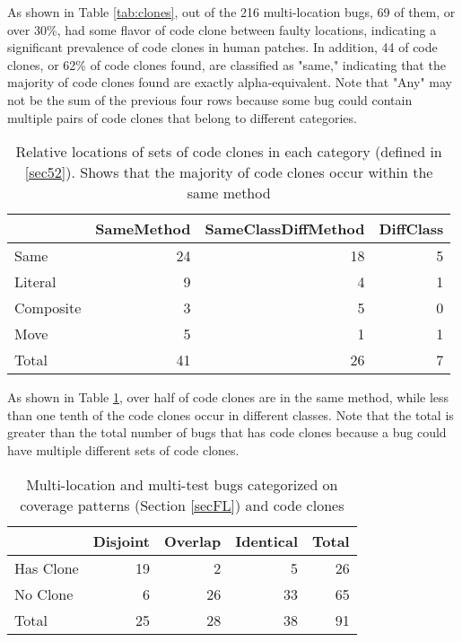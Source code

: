 \documentclass[sigconf, timestamp-false, anonymous=true]{acmart}
\begin{document}
As shown in Table \ref{tab:clones}, out of the 216 multi-location bugs,
69 of them, or over 30\%, had some flavor of code clone between faulty locations, indicating a 
significant 
prevalence of code clones in human patches. In addition, 44 of code clones, or 62\% of code clones 
found, are classified as "same," indicating that the majority of code clones found are exactly 
alpha-equivalent. Note that "Any" may not
be the sum of the previous four rows because some bug could contain multiple pairs of code clones 
that
belong to different categories.


\begin{table}
{\begin{center}
\begin{tabular} {| l | r | r | r |}
\hline
& SameMethod & SameClassDiffMethod & DiffClass \\
\hline
Same & 24 & 18 & 5  \\ 
Literal & 9 & 4 & 1  \\
Composite & 3 & 5 & 0  \\
Move & 5 & 1 & 1  \\ \hline
Total & 41 & 26 & 7 \\ \hline
\end{tabular}
\end{center}
}
\caption{Relative locations of sets of code clones in each category (defined in \ref{sec52}).
Shows that the majority of code clones occur within the same method}
\label{tab:clones_loc}
\end{table}

As shown in Table \ref{tab:clones_loc}, over half of code clones are in the same method, while less than
one tenth of the code clones occur in different classes. Note that the total is greater
than the total number of bugs that has code clones because a bug could have multiple different 
sets of code clones.

\begin{table}
	{\begin{center}
			\begin{tabular} {| l | r r r | r |}
				\hline
				& Disjoint & Overlap & Identical & Total \\
				\hline
				Has Clone & 19 & 2 & 5 & 26 \\
				No Clone & 6 & 26 & 33 &  65\\ \hline
				Total & 25 & 28 & 38 & 91 \\ \hline
			\end{tabular}
		\end{center}
	}
	\caption{Multi-location and multi-test bugs categorized on coverage patterns (Section 
		\ref{secFL}) and code clones}
	\label{tab:cov_clones}
\end{table}
\end{document}
